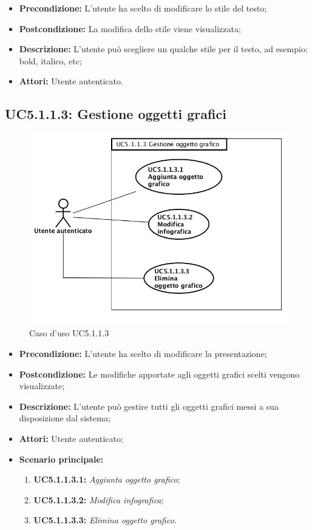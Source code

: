 \begin{itemize}
	\item \textbf{Precondizione:} L'utente ha scelto di modificare lo stile del testo;
	\item \textbf{Postcondizione:} La modifica dello stile viene visualizzata;
	\item \textbf{Descrizione:} L'utente può scegliere un qualche stile per il testo, ad esempio: bold, italico, etc;
	\item \textbf{Attori:} Utente autenticato.
\end{itemize}
\newpage
\subsection{ UC5.1.1.3: Gestione oggetti grafici}

\begin{figure}[h]
	\begin{center}
	\includegraphics[scale=0.4]{diagram/UC5-1-1-3.png}
	\caption{Caso d'uso UC5.1.1.3}
	\end{center}
\end{figure}
\begin{itemize}
	\item \textbf{Precondizione:} L'utente ha scelto di modificare la presentazione;
	\item \textbf{Postcondizione:} Le modifiche apportate agli oggetti grafici scelti vengono visualizzate;
	\item \textbf{Descrizione:} L'utente può gestire tutti gli oggetti grafici messi a sua disposizione dal sistema;
	\item \textbf{Attori:} Utente autenticato;
	\item \textbf{Scenario principale:}
	\begin{enumerate}
		\item \textbf{ UC5.1.1.3.1:} \textit{ Aggiunta oggetto grafico};
		\item \textbf{ UC5.1.1.3.2:} \textit{ Modifica infografica};
		\item \textbf{ UC5.1.1.3.3:} \textit{ Elimina oggetto grafico}.
	\end{enumerate}
\end{itemize}


